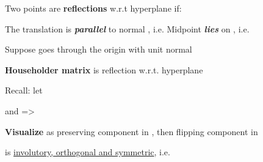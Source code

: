 \begin{itemize}

      \vItem
            Two points  are
            \textbf{reflections} w.r.t hyperplane
             if:

            \begin{enumerate}
                  \vItem
                        The translation
                        is \textbf{\emph{parallel}} to normal ,
                        i.e. 
                  \vItem
                        Midpoint 
                        \textbf{\emph{lies}} on ,
                        i.e. 
            \end{enumerate}
      \vItem
            Suppose
            goes through the origin with unit normal 

            \begin{itemize}

                  \vItem
                        \textbf{Householder matrix}
                        is reflection w.r.t. hyperplane 

                  \vItem
                        Recall: let

                        \tcbbreak

                        \begin{itemize}

                              \vItem
                                    and
                                    =>
                                    
                              \vItem
                                    \textbf{Visualize} as preserving component in
                                    , then flipping component in 
                        \end{itemize}
                  \vItem
                         is \underline{involutory, orthogonal and symmetric},
                        i.e. 
            \end{itemize}
\end{itemize}